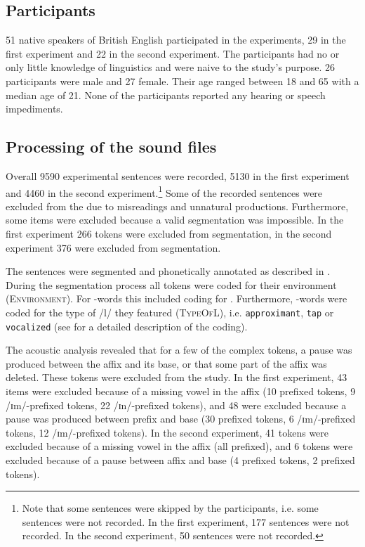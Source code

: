 	
	\subsection{Participants}
	
51 native speakers of British English participated in the experiments, 29 in the first experiment and 22 in the second experiment. The participants had no or only little knowledge of linguistics and were naive to the study's purpose. 26 participants were male and 27 female. Their age ranged between 18 and 65 with a median age of 21. None of the participants reported any hearing or speech impediments.
	


\subsection{Processing of the sound files}

Overall 9590 experimental sentences were recorded, 5130 in the first experiment and 4460 in the second experiment.\footnote{Note that some sentences were skipped by the participants, i.e. some sentences were not recorded. In the first experiment, 177 sentences were not recorded. In the second experiment, 50 sentences were not recorded. } 
Some of the recorded sentences were excluded from the  due to misreadings and unnatural productions. Furthermore, some items  were excluded because a valid segmentation was impossible. In the first experiment 266 tokens were excluded from segmentation, in the second experiment 376 were excluded from segmentation.



The sentences were segmented and phonetically annotated as described in . 
During the segmentation process all tokens were coded for their environment (\textsc{Environment}). For -words this included coding for . Furthermore, -words were coded for the type of /l/ they featured (\textsc{TypeOfL}), i.e. \texttt{approximant}, \texttt{tap} or \texttt{vocalized} (see  for a detailed description of the coding).


 The acoustic analysis revealed that for a few of the complex tokens, a pause was produced between the affix and its base, or that some part of the affix was deleted. These tokens were excluded from the study. 
 In the first experiment, 43 items were excluded because of a missing vowel in the affix  (10  prefixed tokens,  9 /ɪm/-prefixed tokens, 22 /ɪn/-prefixed tokens), and 48 were excluded because a pause was produced between prefix and base (30  prefixed tokens,  6 /ɪm/-prefixed tokens, 12 /ɪm/-prefixed tokens). 
 In the second experiment, 41 tokens were excluded because of a missing vowel in the affix (all prefixed), and 6 tokens were excluded because of a pause between affix and base (4 prefixed tokens, 2 prefixed tokens). %


